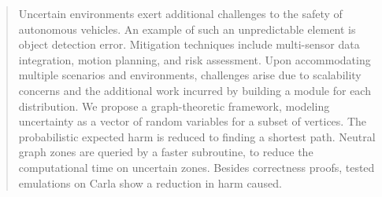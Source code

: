 \begin{abstract}
    Uncertain environments exert additional challenges to the safety of autonomous vehicles. An example of such an unpredictable element is object detection error. Mitigation techniques include multi-sensor data integration, motion planning, and risk assessment. Upon accommodating multiple scenarios and environments, challenges arise due to scalability concerns and the additional work incurred by building a module for each distribution. We propose a graph-theoretic framework, modeling uncertainty as a vector of random variables for a subset of vertices. The probabilistic expected harm is reduced to finding a shortest path. Neutral graph zones are queried by a faster subroutine, to reduce the computational time on uncertain zones. Besides correctness proofs, tested emulations on Carla show a reduction in harm caused.
\end{abstract}